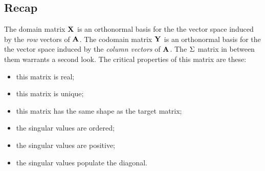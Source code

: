 \subsection{Recap}
The domain matrix $\textbf{X}^{\mathrm{}}$ is an orthonormal basis for the the vector space induced by the \textit{row} vectors of $\textbf{A}^{\mathrm{}}$. The codomain matrix $\textbf{Y}^{\mathrm{}}$ is an orthonormal basis for the the vector space induced by the \textit{column vectors} of $\textbf{A}^{\mathrm{}}$. The $\Sigma^{\mathrm{}}$ matrix in between them warrants a second look. The critical properties of this matrix are these:
\begin{itemize}
\item this matrix is real;
\item this matrix is unique;
\item this matrix has the same shape as the target matrix;
\item the singular values are ordered;
\item the singular values are positive;
\item the singular values populate the diagonal.
\end{itemize}

\endinput